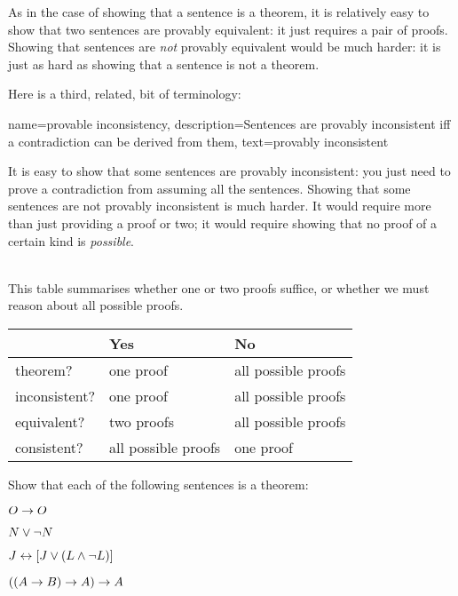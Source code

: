 As in the case of showing that a sentence is a theorem, it is relatively easy to show that two sentences are provably equivalent: it just requires a pair of proofs. Showing that sentences are \emph{not} provably equivalent would be much harder: it is just as hard as showing that a sentence is not a theorem. 

Here is a third, related, bit of terminology:
        
{    name={provable inconsistency}, 
  description={Sentences are provably inconsistent iff a contradiction can be derived from them},
    text={provably inconsistent}
}

        It is easy to show that some sentences are provably inconsistent: you just need to prove a contradiction from assuming all the sentences. Showing that some sentences are not provably inconsistent is much harder. It would require more than just providing a proof or two; it would require showing that no proof of a certain kind is \emph{possible}.

\
\\
This table summarises whether one or two proofs suffice, or whether we must reason about all possible proofs.

\begin{center}
\begin{tabular}{l l l}
 & \textbf{Yes} & \textbf{No}\\
 \hline
theorem? & one proof & all possible proofs\\
inconsistent? &  one proof  & all possible proofs\\
equivalent? & two proofs & all possible proofs\\
consistent? & all possible proofs & one proof\\
\end{tabular}
\end{center}


\practiceproblems
\problempart
Show that each of the following sentences is a theorem:
\begin{earg}
\item $O \rightarrow O$
\item $N \vee \neg N$
\item $J \leftrightarrow [J\vee (L\wedge\neg L)]$
\item $((A \rightarrow B) \rightarrow A) \rightarrow A$ 
\end{earg}

